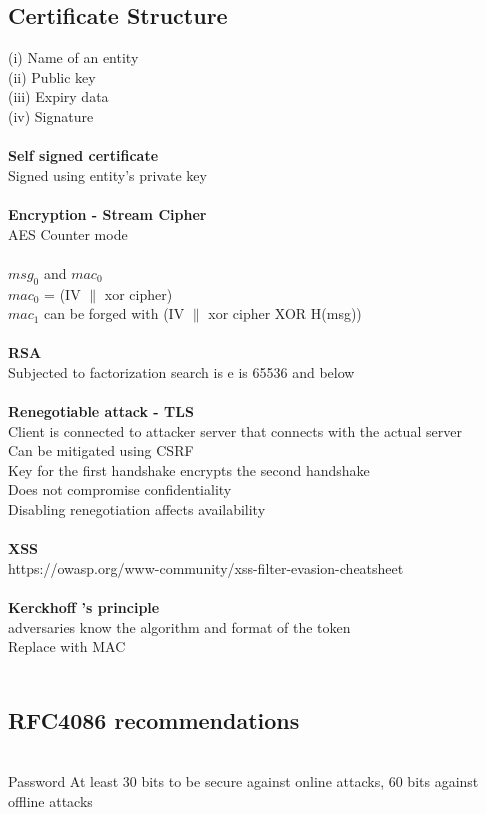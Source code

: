 \documentclass[11pt]{article}
\begin{document}
\begin{multicols*}{3}
\subsection*{Certificate Structure}
(i) Name of an entity \\
(ii) Public key \\
(iii) Expiry data \\
(iv) Signature\\\\
\textbf{Self signed certificate}\\
Signed using entity's private key\\\\
\textbf{Encryption - Stream Cipher}\\
AES Counter mode\\\\
$msg_{0}$ and $mac_{0}$ \\
$ mac_{0}$ = (IV $\|$ xor cipher)\\
$mac_{1}$ can be forged with (IV $\|$ xor cipher XOR H(msg))\\\\
\textbf{RSA}\\
Subjected to factorization search is e is  65536 and below\\\\
\textbf{Renegotiable attack - TLS}\\
Client is connected to attacker server that connects with the actual server\\
Can be mitigated using CSRF\\
Key for the first handshake encrypts the second handshake\\
Does not compromise confidentiality\\
Disabling renegotiation affects availability
\\\\
\textbf{XSS}\\
\textcolor{link}{https://owasp.org/www-community/xss-filter-evasion-cheatsheet}\\\\
\textbf{Kerckhoff  ’s principle}\\
adversaries know the
algorithm and format of the token\\
Replace with MAC
\\\\
\subsection*{RFC4086 recommendations}\\
Password At least 30 bits to be secure against online attacks, 60 bits against offline attacks \\

\end{multicols*}
\end{document}
